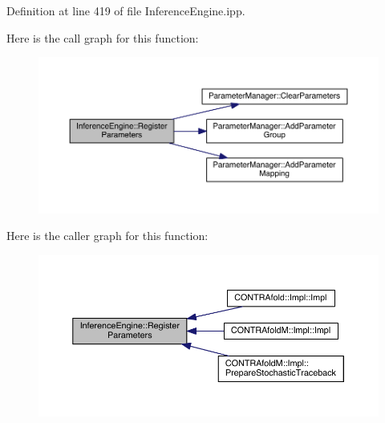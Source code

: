 Definition at line 419 of file Inference\+Engine.\+ipp.



Here is the call graph for this function\+:
\nopagebreak
\begin{figure}[H]
\begin{center}
\leavevmode
\includegraphics[width=350pt]{class_inference_engine_a5f4b92138aaa9a45fcc045f818286bd8_cgraph}
\end{center}
\end{figure}




Here is the caller graph for this function\+:
\nopagebreak
\begin{figure}[H]
\begin{center}
\leavevmode
\includegraphics[width=350pt]{class_inference_engine_a5f4b92138aaa9a45fcc045f818286bd8_icgraph}
\end{center}
\end{figure}


